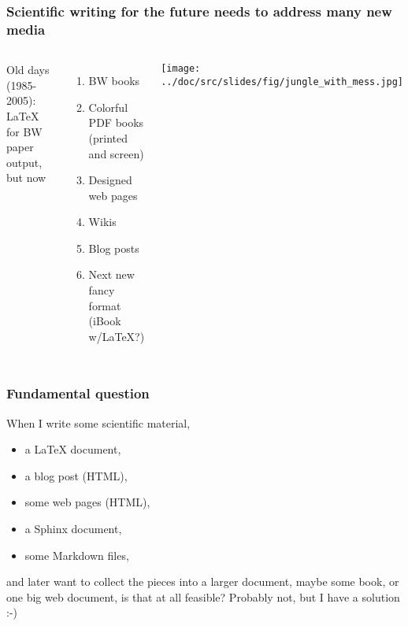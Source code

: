 \documentclass{beamer}
\begin{document}
\begin{frame}
\frametitle{Scientific writing for the future needs to address many new media}

\begin{columns}
Old days (1985-2005): {\LaTeX} for BW paper output, but now
\begin{enumerate}
  \item BW books
  \item Colorful PDF books (printed and screen)
  \item Designed web pages
  \item Wikis
  \item Blog posts
  \item Next new fancy format (iBook w/LaTeX?)
\end{enumerate}
\noindent

\vspace{6mm}
\centerline{\texttt{[image: ../doc/src/slides/fig/jungle\_with\_mess.jpg]}}
\vspace{6mm}

\end{columns}
\end{frame}

\begin{frame}
\frametitle{Fundamental question}

When I write some scientific material,
\begin{itemize}
 \item a {\LaTeX} document,
 \item a blog post (HTML),
 \item some web pages (HTML),
 \item a Sphinx document,
 \item some Markdown files,
\end{itemize}
\noindent
and later want to collect the pieces into a larger document, maybe
some book, or one big web document, is that at all feasible?
\pause
Probably not, but I have a solution :-)
\end{frame}
\end{document}

